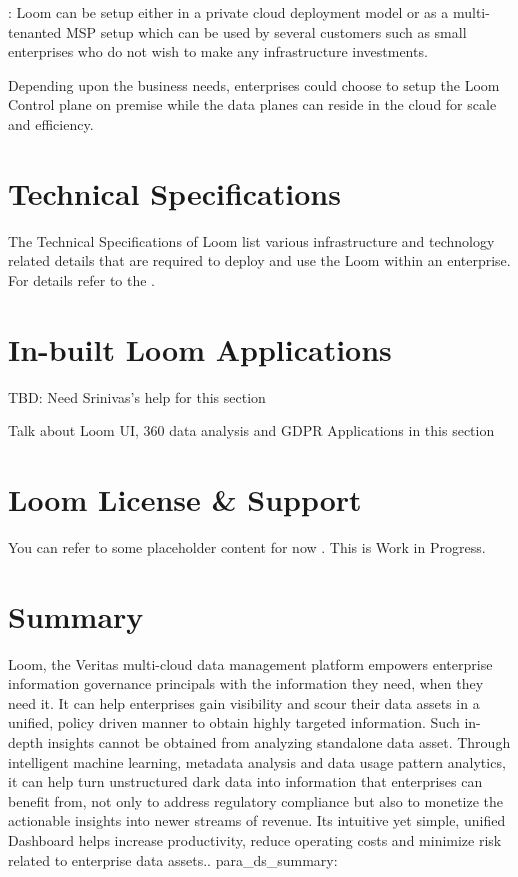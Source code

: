 \documentclass[letterpaper,10pt,english]{sphinxhowto}
\begin{document}
: Loom can be setup either in a private cloud deployment model or as a multi-tenanted MSP setup which can be used by several customers such as small enterprises who do not wish to make any infrastructure investments.

 Depending upon the business needs, enterprises could choose to setup the Loom Control plane on premise while the data planes can reside in the cloud for scale and efficiency.


\section{Technical Specifications}
\label{\detokenize{col/ds/mcdmp_ds_opt2:technical-specifications}}
The Technical Specifications of Loom list various infrastructure and technology related details that are required to deploy and use the Loom within an enterprise. For details refer to the .


\section{In-built Loom Applications}
\label{\detokenize{col/ds/mcdmp_ds_opt2:in-built-loom-applications}}
TBD: Need Srinivas’s help for this section

Talk about Loom UI, 360 data analysis and GDPR Applications in this section


\section{Loom License \& Support}
\label{\detokenize{col/ds/mcdmp_ds_opt2:loom-license-support}}
You can refer to some placeholder content for now . This is Work in Progress.


\section{Summary}
\label{\detokenize{col/ds/mcdmp_ds_opt2:summary}}
Loom, the Veritas multi-cloud data management platform empowers enterprise information governance principals with the information they need, when they need it. It can help enterprises gain visibility and scour their data assets in a unified, policy driven manner to obtain highly targeted information. Such in-depth insights cannot be obtained from analyzing standalone data asset. Through intelligent machine learning, metadata analysis and data usage pattern analytics, it can help turn unstructured dark data into information that enterprises can benefit from, not only to address regulatory compliance but also to monetize the actionable insights into newer streams of revenue. Its intuitive yet simple, unified Dashboard helps increase productivity, reduce operating costs and minimize risk related to enterprise data assets.. para\_ds\_summary:
\end{document}
